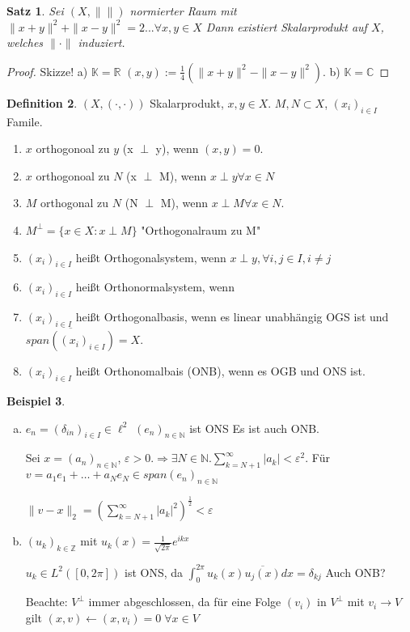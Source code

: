 \documentclass[ngerman]{report}
\theoremstyle{plain}%
\newtheorem{thm}{Satz}[chapter]
\theoremstyle{definition}%
\newtheorem{definition}[thm]{Definition}
\newtheorem{bsp}[thm]{Beispiel}
\theoremstyle{myStyle}
\newcommand{\C}{\mathbb{C}}
\newcommand{\R}{\mathbb{R}}
\newcommand{\Z}{\mathbb{Z}}
\newcommand{\N}{\mathbb{N}}
\newcommand{\K}{\mathbb{K}}
\newcommand{\norm}[1]{\|#1\|}
\newcommand{\df}[1][]{%
	\overset{#1}{\Rightarrow}
}
\newcommand{\qmarks}[1]{"{}#1"{}}
\begin{document}
	\begin{thm}
		Sei $(X,\norm{})$ normierter Raum mit $\norm{x+y}^2 + \norm{x-y}^2 = 2... \forall x,y \in X$ 
		Dann existiert Skalarprodukt auf $X$, welches $\norm{\cdot}$ induziert.
	\end{thm}
	\begin{proof}
		Skizze! a) $\K = \R$ $(x,y) := \frac{1}{4}(\norm{x + y}^2 - \norm{x-y}^2)$. b) $\K = \C$ 

	\end{proof}
\newcommand{\xf}{(x_i)_{i\in I}}
	\newcommand{\ff}[3]{(#1_#2)_{#2\in#3}}
	\newcommand{\SP}{(\cdot,\cdot)}
	\begin{definition}
		$(X,\SP)$ Skalarprodukt, $x,y\in X$. $M,N \subset X$, $(x_i)_{i\in I}$ Famile.
		\begin{enumerate}
			\item $x$ orthogonoal zu $y$ (x $\perp$ y), wenn $(x,y) = 0$.
			\item $x$ orthogonoal zu $N$ (x $\perp$ M), wenn $x \perp y \forall x\in N$
			\item $M$ orthogonal zu $N$ (N $\perp$ M), wenn $x \perp M \forall x\in N$.
			\item $M^\perp = \{x\in X: x\perp M\}$ \qmarks{Orthogonalraum zu M}
			\item $\xf$ heißt Orthogonalsystem, wenn $x \perp y, \forall i,j \in I, i\neq j$
			\item $\xf$ heißt Orthonormalsystem, wenn 
			\item $\xf$ heißt Orthogonalbasis, wenn es linear unabhängig OGS ist und $\overline{span(\xf)} = X$.
			\item $\xf$ heißt Orthonomalbais (ONB), wenn es OGB und ONS ist.	
		\end{enumerate}
	\end{definition}

	\begin{bsp}
		\begin{enumerate}[a)]
			\item $e_n = (\delta_{in})_{i\in I} \in \ell^2$ $(e_n)_{n\in \N}$ ist ONS
			Es ist auch ONB.\par
			Sei $x = (a_n)_{n\in \N}$, $\varepsilon > 0. \df \exists N \in \N. \sum_{k=N+1}^\infty |a_k| < \varepsilon^2$.
			Für $v = a_1e_1 + \dots + a_Ne_N \in span(e_n)_{n\in\N}$ \par
			$\norm{v - x }_2 = (\sum_{k = N +1}^ \infty |a_k|^2)^{\frac{1}{2}} < \varepsilon$

			\item $\ff{u}{k}{\Z}$ mit $u_k(x) = \frac{1}{\sqrt{2\pi}} e^{ikx}$ \par
			$u_k \in L^2([0,2\pi])$ ist ONS, da $\int_0^{2\pi} u_k(x) \overline{u_j(x)} dx = \delta_{kj}$ Auch ONB? \par
			Beachte: $V^\perp$ immer abgeschlossen, da für eine Folge $(v_i)$ in $V^\perp$ mit $v_i \to V$ gilt $(x,v) \leftarrow (x,v_i) = 0 \; \forall x\in V$
		\end{enumerate}
	\end{bsp}
\end{document}

